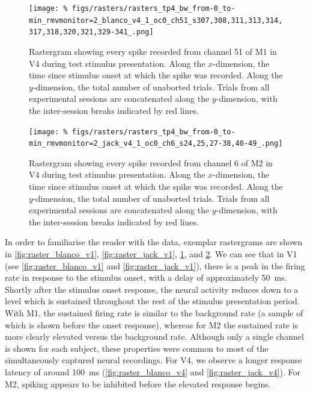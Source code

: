 \begin{figure}[p]
    \centering
    \texttt{[image: \%
figs/rasters/rasters\_tp4\_bw\_from-0\_to-min\_rmvmonitor=2\_blanco\_v4\_1\_oc0\_ch51\_s307,308,311,313,314,317,318,320,321,329-341\_.png]}
    \label{fig:raster_blanco_v4}
    \caption{Rastergram showing every spike recorded from channel \num{51} of \ac{M1} in \ac{V4} during test stimulus presentation.
    Along the $x$-dimension, the time since stimulus onset at which the spike was recorded.
    Along the $y$-dimension, the total number of unaborted trials.
    Trials from all experimental sessions are concatenated along the $y$-dimension, with the inter-session breaks indicated by red lines.
}
\end{figure}


\begin{figure}[p]
    \centering
    \texttt{[image: \%
figs/rasters/rasters\_tp4\_bw\_from-0\_to-min\_rmvmonitor=2\_jack\_v4\_1\_oc0\_ch6\_s24,25,27-38,40-49\_.png]}
    \label{fig:raster_jack_v4}
    \caption{Rastergram showing every spike recorded from channel \num{6} of \ac{M2} in \ac{V4} during test stimulus presentation.
    Along the $x$-dimension, the time since stimulus onset at which the spike was recorded.
    Along the $y$-dimension, the total number of unaborted trials.
    Trials from all experimental sessions are concatenated along the $y$-dimension, with the inter-session breaks indicated by red lines.
}
\end{figure}


In order to familiarise the reader with the data, exemplar rastergrams are shown in \autoref{fig:raster_blanco_v1}, \ref{fig:raster_jack_v1}, \ref{fig:raster_blanco_v4}, and \ref{fig:raster_jack_v4}.
We can see that in \ac{V1} (see \autoref{fig:raster_blanco_v1} and \autoref{fig:raster_jack_v1}), there is a peak in the firing rate in response to the stimulus onset, with a delay of approximately \SI{50}{\milli\second}.
Shortly after the stimulus onset response, the neural activity reduces down to a level which is sustained throughout the rest of the stimulus presentation period.
With \ac{M1}, the sustained firing rate is similar to the background rate (a sample of which is shown before the onset response), whereas for \ac{M2} the sustained rate is more clearly elevated versus the background rate.
Although only a single channel is shown for each subject, these properties were common to most of the simultaneously captured neural recordings.
For \ac{V4}, we observe a longer response latency of around \SI{100}{\milli\second} (\autoref{fig:raster_blanco_v4} and \autoref{fig:raster_jack_v4}).
For \ac{M2}, spiking appears to be inhibited before the elevated response begins.

